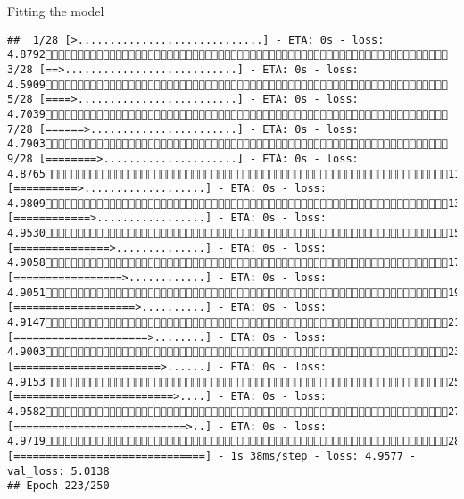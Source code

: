 \documentclass[
  ignorenonframetext,
]{beamer}
\begin{document}
\begin{frame}[fragile]{Fitting the model}
\begin{verbatim}
##  1/28 [>.............................] - ETA: 0s - loss: 4.8792 3/28 [==>...........................] - ETA: 0s - loss: 4.5909 5/28 [====>.........................] - ETA: 0s - loss: 4.7039 7/28 [======>.......................] - ETA: 0s - loss: 4.7903 9/28 [========>.....................] - ETA: 0s - loss: 4.876511/28 [==========>...................] - ETA: 0s - loss: 4.980913/28 [============>.................] - ETA: 0s - loss: 4.953015/28 [===============>..............] - ETA: 0s - loss: 4.905817/28 [=================>............] - ETA: 0s - loss: 4.905119/28 [===================>..........] - ETA: 0s - loss: 4.914721/28 [=====================>........] - ETA: 0s - loss: 4.900323/28 [=======================>......] - ETA: 0s - loss: 4.915325/28 [=========================>....] - ETA: 0s - loss: 4.958227/28 [===========================>..] - ETA: 0s - loss: 4.971928/28 [==============================] - 1s 38ms/step - loss: 4.9577 - val_loss: 5.0138
## Epoch 223/250

\end{verbatim}
\end{frame}
\end{document}
